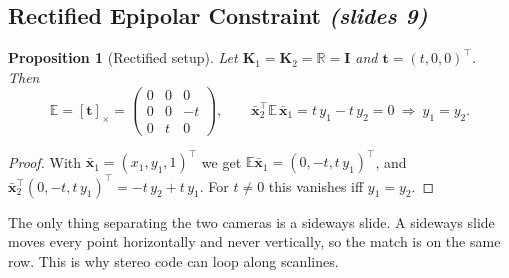 \documentclass[11pt,a4paper]{article}
\newcommand{\slr}[1]{\texorpdfstring{\emph{(slides #1)}}{(slides #1)}}
\newcommand{\R}{\mathbb{R}}
\newcommand{\E}{\mathbb{E}}
\newcommand{\K}{\mathbf{K}}
\newcommand{\xb}{\bar{\bm{x}}}
\newcommand{\vt}{\bm{t}}
\theoremstyle{definition}
\theoremstyle{plain}
\newtheorem{proposition}[definition]{Proposition}
\theoremstyle{remark}
\begin{document}
\subsection{Rectified Epipolar Constraint \slr{9}}
\begin{proposition}[Rectified setup]\label{prop:rect}
Let $\K_1=\K_2=\R=\bm I$ and $\vt=(t,0,0)^{\top}$. Then
\[
\E=[\vt]_\times=\begin{pmatrix}0&0&0\\0&0&-t\\0&t&0\end{pmatrix},\qquad
\xb_2^{\top}\E\,\xb_1=t\,y_1-t\,y_2=0\ \Longrightarrow\ y_1=y_2 .
\]
\end{proposition}
\begin{proof}
With $\xb_1=(x_1,y_1,1)^{\top}$ we get $\E\xb_1=(0,-t,t\,y_1)^{\top}$, and $\xb_2^{\top}(0,-t,t\,y_1)^{\top}=-t\,y_2+t\,y_1$. For $t\neq0$ this vanishes iff $y_1=y_2$.
\end{proof}
\begin{intuition}
The only thing separating the two cameras is a sideways slide. A sideways slide moves every point horizontally and never vertically, so the match is on the same row. This is why stereo code can loop along scanlines.
\end{intuition}
\end{document}
